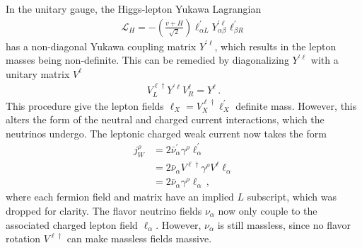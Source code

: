 In the unitary gauge, the Higgs-lepton Yukawa Lagrangian 
\begin{align}
    \label{eq:YukawaLagrangian}
    \mathcal{L}_{H}=-\left( \frac{v + H}{\sqrt{2}} \right) \ell_{\alpha L}^{\prime} Y_{\alpha \beta}^{\prime \ell} \ell_{\beta R}^{\prime}
\end{align}
has a non-diagonal Yukawa coupling matrix $Y^{\prime \ell}$, which results in the lepton masses being non-definite. This can be remedied by diagonalizing $Y^{\prime \ell}$ with a unitary matrix $V^\ell$
\begin{align}\label{eq:leptonYukawaDiag}
    V_{L}^{\ell \dagger} Y^{\prime \ell} V_{R}^{\ell}=Y^{\ell}\,.
\end{align}
This procedure give the lepton fields $\ell_{X}=V_{X}^{\ell \dagger} \ell_{X}^{\prime}$ definite mass. However, this alters the form of the neutral and charged current interactions, which the neutrinos undergo. The leptonic charged weak current now takes the form
\begin{align}
    \label{eq:j_CC}
    j^\rho_W &= 2 \bar{\nu}^\prime_\alpha \gamma^\rho \ell^\prime_\alpha \nonumber \\
             &= 2 \bar{\nu}_\alpha V^{\ell \dagger} \gamma^\rho V^\ell \ell_\alpha \nonumber \\
             &= 2 \bar{\nu}_\alpha \gamma^\rho \ell_\alpha\,,
\end{align}
where each fermion field and matrix have an implied $L$ subscript, which was dropped for clarity. The flavor neutrino fields $\nu_\alpha$ now only couple to the associated charged lepton field $\ell_\alpha$. However, 
$\nu_\alpha$ is still massless, since no flavor rotation $V^{\ell \dagger}$ can make massless fields massive.
% 
% 
% 